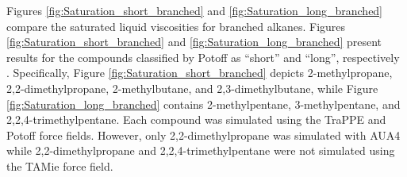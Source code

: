 \documentclass[preprint,review,12pt]{elsarticle}
\begin{document}
	
	Figures \ref{fig:Saturation_short_branched} and \ref{fig:Saturation_long_branched} compare the saturated liquid viscosities for branched alkanes. Figures \ref{fig:Saturation_short_branched} and \ref{fig:Saturation_long_branched} present results for the compounds classified by Potoff as ``short'' and ``long'', respectively \cite{Mie}. Specifically, Figure \ref{fig:Saturation_short_branched} depicts 2-methylpropane, 2,2-dimethylpropane, 2-methylbutane, and 2,3-dimethylbutane, while Figure \ref{fig:Saturation_long_branched} contains 2-methylpentane, 3-methylpentane, and 2,2,4-trimethylpentane. Each compound was simulated using the TraPPE and Potoff force fields. However, only 2,2-dimethylpropane was simulated with AUA4 while 2,2-dimethylpropane and 2,2,4-trimethylpentane were not simulated using the TAMie force field.
	
	
\end{document}
